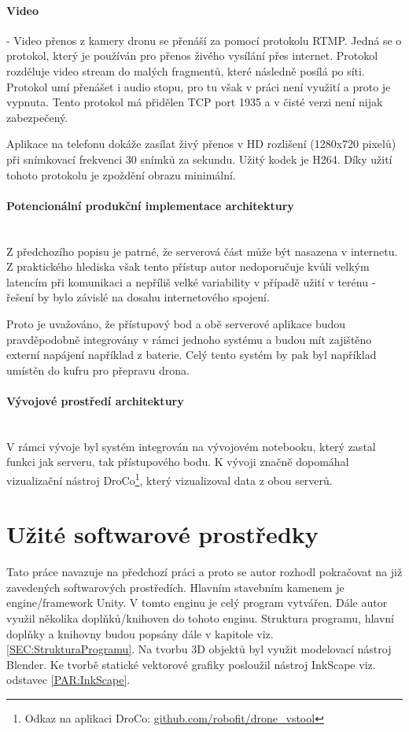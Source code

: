 \paragraph{Video} - Video přenos z kamery dronu se přenáší za pomocí protokolu RTMP. Jedná se o protokol, který je používán pro přenos živého vysílání přes internet. Protokol rozděluje video stream do malých fragmentů, které následně posílá po síti. Protokol umí přenášet i audio stopu, pro tu však v práci není využití a proto je vypnuta. Tento protokol má přidělen TCP port 1935 a v čisté verzi není nijak zabezpečený\cite{RTMP}. 

Aplikace na telefonu dokáže zasílat živý přenos v HD rozlišení (1280x720 pixelů) při snímkovací frekvenci 30 snímků za sekundu. Užitý kodek je H264. Díky užití tohoto protokolu je zpoždění obrazu minimální.

\paragraph{Potencionální produkční implementace architektury}\mbox{} \\
Z předchozího popisu je patrné, že serverová část může být nasazena v internetu. Z praktického hlediska však tento přístup autor nedoporučuje kvůli velkým latencím při komunikaci a nepříliš velké variability v případě užití v terénu - řešení by bylo závislé na dosahu internetového spojení. 

Proto je uvažováno, že přístupový bod a obě serverové aplikace budou pravděpodobně integrovány v rámci jednoho systému a budou mít zajištěno externí napájení například z baterie. Celý tento systém by pak byl například umístěn do kufru pro přepravu drona. 

\paragraph{Vývojové prostředí architektury}\mbox{} \\
V rámci vývoje byl  systém integrován na vývojovém notebooku, který zastal funkci jak serveru, tak přístupového bodu. K vývoji značně dopomáhal vizualizační nástroj  DroCo\footnote{Odkaz na aplikaci DroCo: \href{https://github.com/robofit/drone\_vstool}{github.com/robofit/drone\_vstool}}, který vizualizoval data z obou serverů.

\section{Užité softwarové prostředky} 
Tato práce navazuje na předchozí práci \cite{KyjacMartin2022Vnpp} a proto se autor rozhodl pokračovat na již zavedených softwarových prostředích. Hlavním stavebním kamenem je engine/framework Unity. V tomto enginu je celý program vytvářen. Dále autor využil několika doplňků/knihoven do tohoto enginu. Struktura programu, hlavní doplňky a knihovny budou popsány dále v kapitole viz. \ref{SEC:StrukturaProgramu}. 
Na tvorbu 3D objektů byl využit modelovací nástroj Blender. Ke tvorbě statické vektorové grafiky posloužil nástroj InkScape viz. odstavec \ref{PAR:InkScape}.  
